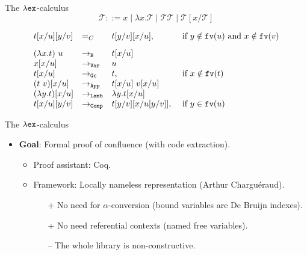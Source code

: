 \documentclass[10pt]{beamer}
\newcommand{\term}{{\mathcal{T}}}
\newcommand{\fv}[1]{{\tt fv}(#1)}
\begin{document}
\begin{frame}[fragile]{The $\lambda{\tt ex}$-calculus}
  $$\term ::= x \mid \lambda x.\term \mid \term\term \mid \term[x/\term]$$

  $$\begin{array}{llll}
      t[x/u][y/v] & =_C & t[y/v][x/u], & \mbox{ if } y \notin\fv{u} \mbox{ and } x \notin \fv{v} \\[.3cm]
      (\lambda x. t)\ u & \to_{\tt B} & t[x/u] & \\      
      x[x/u] & \to_{\tt Var} & u & \\      
      t[x/u] & \to_{\tt Gc} & t, & \mbox{ if } x \notin\fv{t} \\      
      (t\ v)[x/u] & \to_{\tt App} & t[x/u]\ v[x/u] & \\
      (\lambda y. t)[x/u] & \to_{\tt Lamb} & \lambda y.t[x/u] & \\
      t[x/u][y/v] & \to_{\tt Comp} & t[y/v][x/u[y/v]], & \mbox{ if } y \in\fv{u} \\            
      \end{array}$$
\end{frame}

\begin{frame}[fragile]{The $\lambda{\tt ex}$-calculus}
  \begin{itemize}
  \item {\bf Goal}: Formal proof of confluence (with code extraction).
    \begin{itemize}
    \item Proof assistant: Coq.
    \item Framework: Locally nameless representation (Arthur Charguéraud).
      \begin{itemize}
      \item[{\color{blue}+}] No need for $\alpha$-conversion (bound variables are De Bruijn indexes).
      \item[{\color{blue}+}] No need referential contexts (named free variables).
      \item[{\color{red}--}] The whole library is non-constructive.
      \end{itemize}
    \end{itemize}
  \end{itemize}
\end{frame}
\end{document}
